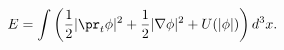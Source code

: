 \begin{equation}
E=\int \left( \frac{1}{2}|\pr_t{\phi}|^{2}+\frac{1}{2}|\nabla \phi
|^{2}+U(|\phi |)\right) d^{3}x.  \label{En}
\end{equation}

